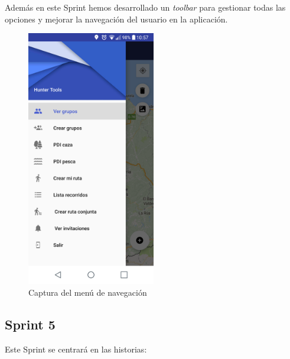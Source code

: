 Además en este Sprint hemos desarrollado un \textit{toolbar} para gestionar todas las opciones y mejorar la navegación del usuario en la aplicación.
\begin{figure}[H]
		\centering
		\includegraphics[width=0.5\textwidth] {capturamovil/opciones}
		\caption{Captura del menú de navegación}
	\end{figure}
\subsection{Sprint 5}
Este Sprint se centrará en las historias:

